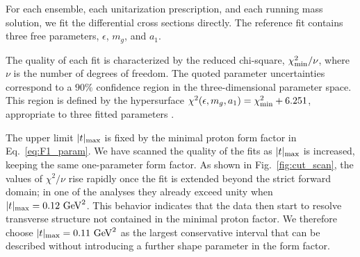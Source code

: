 \documentclass[aps,prd,twocolumn,superscriptaddress,longbibliography,nofootinbib]{revtex4-2}
\newcommand{\GeV}{\mathrm{GeV}}
\newcommand{\TeV}{\mathrm{TeV}}
\begin{document}
For each ensemble, each unitarization prescription, and each running
mass solution, we fit the differential cross sections directly. The
reference fit contains three free parameters, $\epsilon$, $m_{g}$, and $a_{1}$.

The quality of each fit is characterized by the reduced chi-square, $\chi^2_{\rm min}/\nu$, where $\nu$ is the number of degrees of freedom.
The quoted parameter uncertainties correspond to a $90\%$ confidence region in the three-dimensional
parameter space. This region is defined by the hypersurface $\chi^2(\epsilon, m_{g}, a_{1}) = \chi^2_{\rm min} + 6.251$, appropriate to three fitted parameters \cite{JamesRoos1975}.

The upper limit $|t|_{\rm max}$ is fixed by the minimal proton form factor in
Eq.~\eqref{eq:F1_param}.  We have scanned the quality of the fits as
$|t|_{\rm max}$ is increased, keeping the same one-parameter form
factor.  As shown in Fig.~\ref{fig:cut_scan}, the values of
$\chi^2/\nu$ rise rapidly once the fit is extended beyond the strict
forward domain; in one of the analyses they already exceed unity when
$|t|_{\rm max}=0.12~\GeV^2$.  This behavior indicates that the data then
start to resolve transverse structure not contained in the minimal
proton factor.  We therefore choose $|t|_{\rm max}=0.11~\GeV^2$ as the
largest conservative interval that can be described without introducing
a further shape parameter in the form factor.

\end{document}
